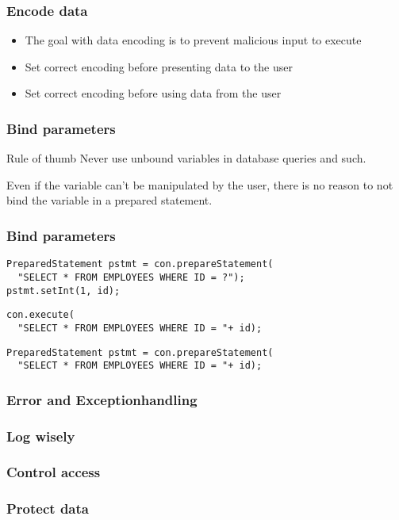 \documentclass{beamer}
\begin{document}
    \begin{frame}
      \frametitle{Encode data}
      \begin{itemize}
        \item The goal with data encoding is to prevent malicious input to execute
        \item Set correct encoding before presenting data to the user
        \item Set correct encoding before using data from the user
      \end{itemize}
    \end{frame}
    \begin{frame}
      \frametitle{Bind parameters}
      \begin{block}{Rule of thumb}
        Never use unbound variables in database queries and such.

        Even if the variable can't be manipulated by the user, there is no reason
        to not bind the variable in a prepared statement.
      \end{block}
    \end{frame}
    \begin{frame}[fragile]
      \frametitle{Bind parameters}
      \begin{example}[Good]
      \begin{lstlisting}
PreparedStatement pstmt = con.prepareStatement(
  "SELECT * FROM EMPLOYEES WHERE ID = ?");
pstmt.setInt(1, id);
      \end{lstlisting}
      \end{example}
      \begin{example}[Bad]
      \begin{lstlisting}
con.execute(
  "SELECT * FROM EMPLOYEES WHERE ID = "+ id);
      \end{lstlisting}
      \end{example}
      \begin{example}[Worst]
      \begin{lstlisting}
PreparedStatement pstmt = con.prepareStatement(
  "SELECT * FROM EMPLOYEES WHERE ID = "+ id);
      \end{lstlisting}
      \end{example}
    \end{frame}
    \begin{frame}
      \frametitle{Error and Exceptionhandling}
    \end{frame}
    \begin{frame}
      \frametitle{Log wisely}
    \end{frame}
    \begin{frame}
      \frametitle{Control access}
    \end{frame}
    \begin{frame}
      \frametitle{Protect data}
    \end{frame}
\end{document}
